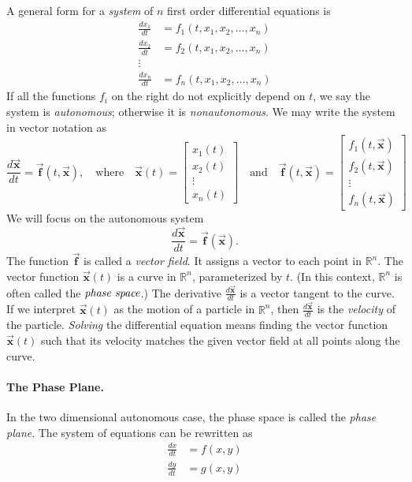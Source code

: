 \documentclass{book}
\newcommand{\BF}{\vec{\textbf{f}}}
\newcommand{\BX}{\vec{\textbf{x}}}
\begin{document}
A general form for a \emph{system} of $n$ first order differential
equations is
\begin{equation}
\begin{split}
  \frac{dx_1}{dt} & = f_1(t,x_1,x_2,\ldots,x_n) \\
  \frac{dx_2}{dt} & = f_2(t,x_1,x_2,\ldots,x_n) \\
  \vdots \\
  \frac{dx_n}{dt} & = f_n(t,x_1,x_2,\ldots,x_n)
\end{split}
\end{equation}
If all the functions $f_i$ on the right do not explicitly depend on
$t$, we say the system is \emph{autonomous}; otherwise it is
\emph{nonautonomous}.
We may write the system in vector notation as
\begin{equation}
   \frac{d\BX}{dt} = \BF(t,\BX),
      \quad
      \textrm{where}
      \quad
      \BX(t) = \begin{bmatrix} x_1(t) \\ x_2(t) \\ \vdots \\ x_n(t)\end{bmatrix}
      \quad
      \textrm{and}
      \quad
      \BF(t,\BX) = \begin{bmatrix} f_1(t,\BX) \\ f_2(t,\BX) \\ \vdots \\ f_n(t,\BX) \end{bmatrix}
\end{equation}
We will focus on the autonomous system
\begin{equation}
   \frac{d\BX}{dt} = \BF(\BX).
\end{equation}
The function $\BF$ is called a \emph{vector field}.
It assigns a vector to each point in $\mathbb{R}^n$.
The vector function $\BX(t)$ is a curve in $\mathbb{R}^n$,
parameterized by $t$.
(In this context, $\mathbb{R}^n$ is often called
the $\emph{phase space}$.)
The derivative $\frac{d\BX}{dt}$ is a vector tangent to
the curve.
If we interpret $\BX(t)$ as the motion of a particle
in $\mathbb{R}^n$, then $\frac{d\BX}{dt}$ is the \emph{velocity}
of the particle.
\emph{Solving} the differential equation means finding
the vector function
$\BX(t)$ such that its velocity matches the given vector field
at all points along the curve.

\paragraph{The Phase Plane.}
In the two dimensional autonomous case, the phase space
is called the \emph{phase plane}.
The system of equations can be rewritten as
\begin{equation}
\begin{split}
    \frac{dx}{dt} & = f(x,y) \\
    \frac{dy}{dt} & = g(x,y)
\end{split}
\end{equation}
\end{document}
